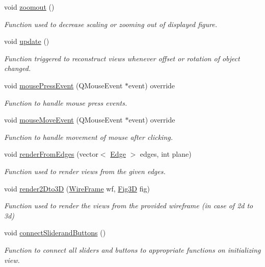 \begin{DoxyCompactItemize}
void \hyperlink{classMainWindow_ac54938e78f6b39c6b62cee61d75e8c22}{zoomout} ()
\begin{DoxyCompactList}\small\item\em Function used to decrease scaling or zooming out of displayed figure. \end{DoxyCompactList}\item 
void \hyperlink{classMainWindow_a128f71880d4b9683149023fc46fcc9f8}{update} ()
\begin{DoxyCompactList}\small\item\em Function triggered to reconstruct views whenever offset or rotation of object changed. \end{DoxyCompactList}\item 
void \hyperlink{classMainWindow_a1dff511c9697cbcb60150894f480b9c8}{mouse\+Press\+Event} (Q\+Mouse\+Event $\ast$event) override
\begin{DoxyCompactList}\small\item\em Function to handle mouse press events. \end{DoxyCompactList}\item 
void \hyperlink{classMainWindow_a9c8748d463f01ddae6abcd8f8163fcef}{mouse\+Move\+Event} (Q\+Mouse\+Event $\ast$event) override
\begin{DoxyCompactList}\small\item\em Function to handle movement of mouse after clicking. \end{DoxyCompactList}\item 
void \hyperlink{classMainWindow_a3309de2dae8bbfaf0ff645fe372aa644}{render\+From\+Edges} (vector$<$ \hyperlink{structEdge}{Edge} $>$ edges, int plane)
\begin{DoxyCompactList}\small\item\em Function used to render views from the given edges. \end{DoxyCompactList}\item 
void \hyperlink{classMainWindow_a91288f71f3b29443c1243ddb653f3898}{render2\+Dto3D} (\hyperlink{classWireFrame}{Wire\+Frame} wf, \hyperlink{classFig3D}{Fig3D} fig)
\begin{DoxyCompactList}\small\item\em Function used to render the views from the provided wireframe (in case of 2d to 3d) \end{DoxyCompactList}\item 
void \hyperlink{classMainWindow_acc4ea38c583bc825f258ab2ec432e835}{connect\+Sliderand\+Buttons} ()
\begin{DoxyCompactList}\small\item\em Function to connect all sliders and buttons to appropriate functions on initializing view. \end{DoxyCompactList}\end{DoxyCompactItemize}
